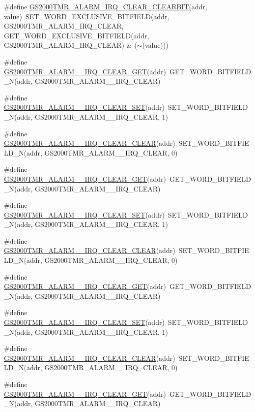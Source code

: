 \begin{DoxyCompactItemize}
\item 
\#define \hyperlink{a00555_a4bb1e5954ceae9ed5dbb9d1438298a2c}{GS2000TMR\_\-ALARM\_\-IRQ\_\-CLEAR\_\-CLEARBIT}(addr, value)~SET\_\-WORD\_\-EXCLUSIVE\_\-BITFIELD(addr, GS2000TMR\_\-ALARM\_\-IRQ\_\-CLEAR, GET\_\-WORD\_\-EXCLUSIVE\_\-BITFIELD(addr, GS2000TMR\_\-ALARM\_\-IRQ\_\-CLEAR) \& ($\sim$(value)))
\item 
\#define \hyperlink{a00555_a03f5ef6346bba587be5bc72734dbf485}{GS2000TMR\_\-ALARM\_\_\-IRQ\_\-CLEAR\_\-GET}(addr)~GET\_\-WORD\_\-BITFIELD\_\-N(addr, GS2000TMR\_\-ALARM\_\_\-IRQ\_\-CLEAR)
\item 
\#define \hyperlink{a00555_a894e396e95d470850e00d2499c6dac4b}{GS2000TMR\_\-ALARM\_\_\-IRQ\_\-CLEAR\_\-SET}(addr)~SET\_\-WORD\_\-BITFIELD\_\-N(addr, GS2000TMR\_\-ALARM\_\_\-IRQ\_\-CLEAR, 1)
\item 
\#define \hyperlink{a00555_a6607d13af61cb81546e328cf6abcc1a6}{GS2000TMR\_\-ALARM\_\_\-IRQ\_\-CLEAR\_\-CLEAR}(addr)~SET\_\-WORD\_\-BITFIELD\_\-N(addr, GS2000TMR\_\-ALARM\_\_\-IRQ\_\-CLEAR, 0)
\item 
\#define \hyperlink{a00555_a446a1908d9bec267df1489f8816c0d38}{GS2000TMR\_\-ALARM\_\_\-IRQ\_\-CLEAR\_\-GET}(addr)~GET\_\-WORD\_\-BITFIELD\_\-N(addr, GS2000TMR\_\-ALARM\_\_\-IRQ\_\-CLEAR)
\item 
\#define \hyperlink{a00555_a40467c32df5178859149af4cc06c6831}{GS2000TMR\_\-ALARM\_\_\-IRQ\_\-CLEAR\_\-SET}(addr)~SET\_\-WORD\_\-BITFIELD\_\-N(addr, GS2000TMR\_\-ALARM\_\_\-IRQ\_\-CLEAR, 1)
\item 
\#define \hyperlink{a00555_a42b1811e6a36a77901b69bf03dcbdb92}{GS2000TMR\_\-ALARM\_\_\-IRQ\_\-CLEAR\_\-CLEAR}(addr)~SET\_\-WORD\_\-BITFIELD\_\-N(addr, GS2000TMR\_\-ALARM\_\_\-IRQ\_\-CLEAR, 0)
\item 
\#define \hyperlink{a00555_a0347ff9bff03384c7268b6653612d23e}{GS2000TMR\_\-ALARM\_\_\-IRQ\_\-CLEAR\_\-GET}(addr)~GET\_\-WORD\_\-BITFIELD\_\-N(addr, GS2000TMR\_\-ALARM\_\_\-IRQ\_\-CLEAR)
\item 
\#define \hyperlink{a00555_aad0a1f8f8c0dca73cce135dcba6ea726}{GS2000TMR\_\-ALARM\_\_\-IRQ\_\-CLEAR\_\-SET}(addr)~SET\_\-WORD\_\-BITFIELD\_\-N(addr, GS2000TMR\_\-ALARM\_\_\-IRQ\_\-CLEAR, 1)
\item 
\#define \hyperlink{a00555_a99b8ad929e239b33aa78668d16fd0d83}{GS2000TMR\_\-ALARM\_\_\-IRQ\_\-CLEAR\_\-CLEAR}(addr)~SET\_\-WORD\_\-BITFIELD\_\-N(addr, GS2000TMR\_\-ALARM\_\_\-IRQ\_\-CLEAR, 0)
\item 
\#define \hyperlink{a00555_a183927b3888dbd2b69a10a759541daa2}{GS2000TMR\_\-ALARM\_\_\-IRQ\_\-CLEAR\_\-GET}(addr)~GET\_\-WORD\_\-BITFIELD\_\-N(addr, GS2000TMR\_\-ALARM\_\_\-IRQ\_\-CLEAR)

\end{DoxyCompactItemize}
